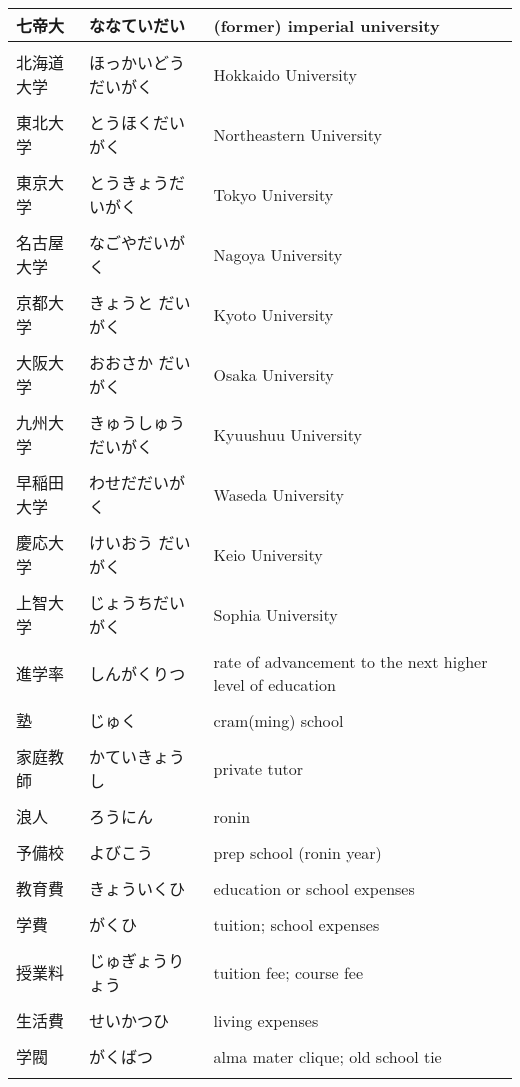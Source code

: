\documentclass{article}
\begin{document}
\begin{tabular}{ l | p{6.7cm} | p{7.5cm} }
七帝大 &   ななていだい & (former) imperial university  \\ \hline \\[-1em]
北海道大学 & ほっかいどうだいがく & Hokkaido University \\ \hline \\[-1em]
東北大学 &  とうほくだいがく  & Northeastern University \\ \hline \\[-1em]
東京大学 & とうきょうだいがく & Tokyo University \\ \hline \\[-1em]
名古屋大学 &  なごやだいがく & Nagoya University \\ \hline \\[-1em]
京都大学 &  きょうと だいがく& Kyoto University \\ \hline \\[-1em]
大阪大学 &  おおさか だいがく& Osaka University \\ \hline \\[-1em]
九州大学 &  きゅうしゅうだいがく& Kyuushuu University \\ \hline \\[-1em]
早稲田大学 & わせだだいがく& Waseda University \\ \hline \\[-1em]
慶応大学 &  けいおう だいがく& Keio University \\ \hline \\[-1em]
上智大学 &  じょうちだいがく& Sophia University \\ \hline \\[-1em]
進学率 &  しんがくりつ  & rate of advancement to the next higher level of education\\ \hline \\[-1em]
塾 & じゅく &  cram(ming) school \\ \hline \\[-1em]
家庭教師 &  かていきょうし  & private tutor\\ \hline \\[-1em]
浪人 &  ろうにん & ronin \\ \hline \\[-1em]
予備校 &  よびこう & prep school (ronin year) \\ \hline \\[-1em]
教育費 &  きょういくひ & education or school expenses\\ \hline \\[-1em]
学費  &  がくひ & tuition; school expenses\\ \hline \\[-1em]
授業料 &  じゅぎょうりょう & tuition fee; course fee\\ \hline \\[-1em]
生活費 &  せいかつひ & living expenses \\ \hline \\[-1em]
学閥 &  がくばつ & alma mater clique; old school tie\\ \hline \\[-1em]
\end{tabular}
\end{document}
